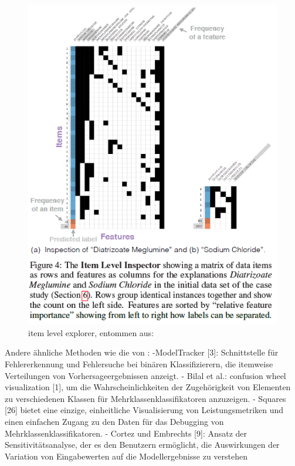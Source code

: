 \begin{figure}
    \centering
    \includegraphics[scale=0.45]{pic/MA-Bilder/Literaturrecherche/25-itemlevelExplorer.PNG}
    \caption{item level explorer, entommen aus: \cite{krause2017workflow}}
    \label{Fig:Krause-itemLevelExplorer}
\end{figure}

Andere ähnliche Methoden wie die von \cite{krause2017workflow}: 
-ModelTracker [3]: Schnittstelle für Fehlererkennung und Fehlersuche bei binären Klassifizierern, die itemweise Verteilungen von Vorhersageergebnissen anzeigt. 
- Bilal et al.: confusion wheel visualization [1], um die Wahrscheinlichkeiten der Zugehörigkeit von Elementen zu verschiedenen Klassen für Mehrklassenklassifikatoren anzuzeigen. 
- Squares [26] bietet eine einzige, einheitliche Visualisierung von Leistungsmetriken und einen einfachen Zugang zu den Daten für das Debugging von Mehrklassenklassifikatoren.
- Cortez und Embrechts [9]: Ansatz der Sensitivitätsanalyse, der es den Benutzern ermöglicht, die Auswirkungen der Variation von Eingabewerten auf die Modellergebnisse zu verstehen
